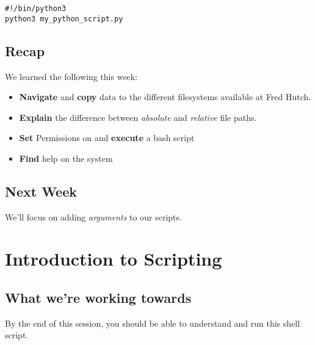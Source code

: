 \documentclass[
  letterpaper,
  DIV=11,
  numbers=noendperiod]{scrreprt}
\newenvironment{Shaded}{\begin{snugshade}}{\end{snugshade}}
\newcommand{\AttributeTok}[1]{\textcolor[rgb]{0.40,0.45,0.13}{#1}}
\newcommand{\CommentTok}[1]{\textcolor[rgb]{0.37,0.37,0.37}{#1}}
\newcommand{\ExtensionTok}[1]{\textcolor[rgb]{0.00,0.23,0.31}{#1}}
\newcommand{\NormalTok}[1]{\textcolor[rgb]{0.00,0.23,0.31}{#1}}
\newcommand{\OperatorTok}[1]{\textcolor[rgb]{0.37,0.37,0.37}{#1}}
\newcommand{\VariableTok}[1]{\textcolor[rgb]{0.07,0.07,0.07}{#1}}
\providecommand{\tightlist}{%
  \setlength{\itemsep}{0pt}\setlength{\parskip}{0pt}}
\begin{document}
\begin{verbatim}
#!/bin/python3
python3 my_python_script.py
\end{verbatim}

\section{Recap}\label{recap}

We learned the following this week:

\begin{itemize}
\tightlist
\item
  \textbf{Navigate} and \textbf{copy} data to the different filesystems
  available at Fred Hutch.
\item
  \textbf{Explain} the difference between \emph{absolute} and
  \emph{relative} file paths.
\item
  \textbf{Set} Permissions on and \textbf{execute} a bash script
\item
  \textbf{Find} help on the system
\end{itemize}

\section{Next Week}\label{next-week}

We'll focus on adding \emph{arguments} to our scripts.


\chapter{Introduction to Scripting}\label{introduction-to-scripting}

\section{What we're working towards}\label{what-were-working-towards}

By the end of this session, you should be able to understand and run
this shell script.

\begin{Shaded}
\end{Shaded}
\end{document}
